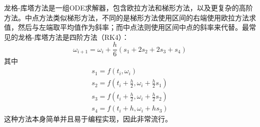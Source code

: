 \documentclass[UTF8,a4paper,10pt]{ctexart}
\begin{document}
\begin{multicols}{2}
            龙格-库塔方法是一组ODE求解器，包含欧拉方法和梯形方法，以及更复杂的高阶方法。中点方法类似梯形方法，不同的是梯形方法使用区间的右端使用欧拉方法求值，然后与左端取平均值作为斜率；而中点法则使用区间中点的斜率来代替。最常见的龙格-库塔方法是四阶方法（RK4）：
            \begin{equation}
                \omega_{i+1} = \omega_i + \frac{h}{6}(s_1+2s_2+2s_3+s_4)
            \end{equation}
            其中
            \begin{equation*}
                \begin{array}{l}
                    s_1 = f(t_i,\omega_i)\\
                    s_2 = f(t_i+\frac{h}{2},\omega_i+\frac{h}{2}s_1)\\
                    s_3 = f(t_i+\frac{h}{2},\omega_i+\frac{h}{2}s_2)\\
                    s_4 = f(t_i+h,\omega_i+hs_3)
                \end{array}
            \end{equation*}
            这种方法本身简单并且易于编程实现，因此非常流行。\par

\end{multicols}
\end{document}
